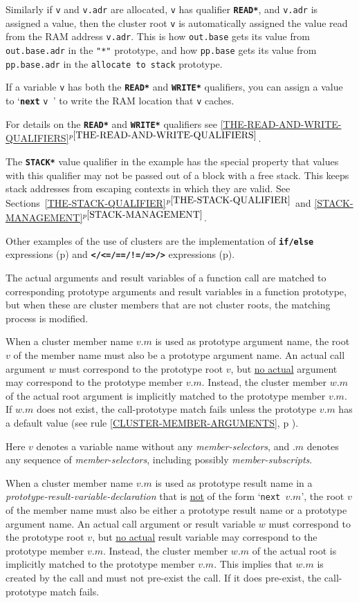 \documentclass[12pt]{article}
\newcommand{\TT}[1]{{\tt \bfseries #1}}
\newcommand{\itemref}[1]{\ref{#1}$^{p\pageref{#1}}$}
\newcommand{\pagref}[1]{p\pageref{#1}}
\begin{document}
Similarly if {\tt v} and {\tt v.adr} are allocated, {\tt v} has qualifier
\TT{*READ*}, and {\tt v.adr} is assigned a value, then
the cluster root {\tt v} is automatically
assigned the value read from the RAM address {\tt v.adr}.
This is how {\tt out.base} gets its value from
{\tt out.base.adr} in the {\tt "*"} prototype, and
how {\tt pp.base} gets its value from
{\tt pp.base.adr} in the {\tt allocate to stack} prototype.

If a variable {\tt v} has both the \TT{*READ*} and \TT{*WRITE*}
qualifiers, you can assign a value to `\TT{next} {\tt v }' to write
the RAM location that {\tt v} caches.

For details on the \TT{*READ*} and \TT{*WRITE*} qualifiers
see \itemref{THE-READ-AND-WRITE-QUALIFIERS}.

The \TT{*STACK*} value qualifier in the example has the special property
that values with
this qualifier may not be passed out of a block with a free
stack.  This keeps stack addresses from escaping contexts in
which they are valid.  See Sections~\itemref{THE-STACK-QUALIFIER} and
\itemref{STACK-MANAGEMENT}.

Other examples of the use of clusters are the implementation of
\TT{if/else} expressions (\pagref{IF-ELSE-IMPLEMENTATION})
and \TT{</<=/==/!=/=>/>} expressions (\pagref{COMPARE-IMPLEMENTATION}).

The actual arguments and result variables of a function call are
matched to corresponding prototype arguments and result variables in
a function prototype, but when these are cluster members that are
not cluster roots, the matching process is modified.

When a cluster member name $v.m$ is used as prototype argument name,
the root $v$ of the member name must also be a prototype argument name.
An actual call argument $w$ must correspond to the prototype root $v$, but
\underline{no actual} argument may correspond to the prototype member $v.m$.
Instead, the cluster member $w.m$ of the actual root argument is implicitly
matched to the prototype member $v.m$.  If $w.m$ does not exist,
the call-prototype match fails unless the prototype $v.m$ has a
default value (see rule \ref{CLUSTER-MEMBER-ARGUMENTS},
\pagref{CLUSTER-MEMBER-ARGUMENTS} ).

Here $v$ denotes a variable name without any {\em member-selectors},
and $.m$ denotes any sequence of {\em member-selectors}, including possibly
{\em member-subscripts}.

When a cluster member name $v.m$ is used as prototype result name in
a {\em prototype-result-variable-declaration} that is \underline{not}
of the form `{\tt next $v.m$}',
the root $v$ of the member name must also be either a prototype result name
or a prototype argument name.
An actual call argument or result variable
$w$ must correspond to the prototype root $v$, but
\underline{no actual} result variable
may correspond to the prototype member $v.m$.
Instead, the cluster member $w.m$ of the actual root is implicitly
matched to the prototype member $v.m$.  This implies that $w.m$ is
created by the call and must
not pre-exist the call.  If it does pre-exist, the call-prototype match fails.
\end{document}
